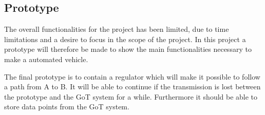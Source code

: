\subsection{Prototype}
The overall functionalities for the project has been limited, due to time limitations and a desire to focus in the scope of the project. In this project a prototype will therefore be made to show the main functionalities necessary to make a automated vehicle.

The final prototype is to contain a regulator which will make it possible to follow a path from A to B. It will be able to continue if the transmission is lost between the prototype and the GoT system for a while. Furthermore it should be able to store data points from the GoT system.

